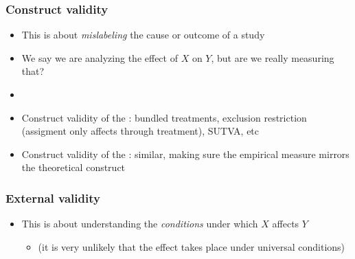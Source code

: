 \documentclass[aspectratio=43]{beamer}
\begin{document}
\begin{frame}
\frametitle{Construct validity}
\centering

\begin{itemize}
  \item This is about \textit{mislabeling} the cause or outcome of a study
  \item We say we are analyzing the effect of $X$ on $Y$, but are we really measuring that?
  \item[]
  \item<2->[1.] Construct validity of the : bundled treatments, exclusion restriction (assigment only affects through treatment), SUTVA, etc
  \item<2->[2.] Construct validity of the : similar, making sure the empirical measure mirrors the theoretical construct
\end{itemize}

\end{frame}

\begin{frame}
\frametitle{External validity}
\centering

\begin{itemize}
  \item This is about understanding the \textit{conditions} under which $X$ affects $Y$
  \begin{itemize}
    \item[] (it is very unlikely that the effect takes place under universal conditions)
  \end{itemize}
\end{itemize}

\end{frame}
\end{document}
